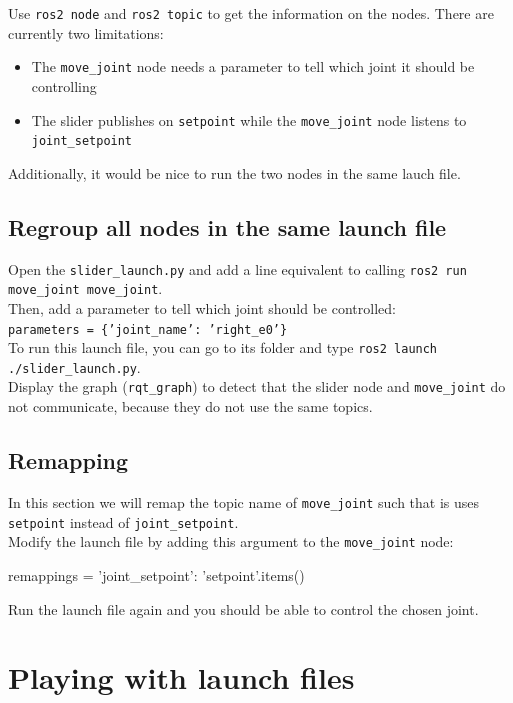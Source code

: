 \documentclass{ecnreport}
\begin{document}
Use \texttt{ros2 node} and \texttt{ros2 topic} to get the information on the nodes. There are currently two limitations:
\begin{itemize}
 \item The \texttt{move\_joint} node needs a parameter to tell which joint it should be controlling
 \item The slider publishes on \texttt{setpoint} while the  \texttt{move\_joint} node listens to \texttt{joint\_setpoint}
\end{itemize}
Additionally, it would be nice to run the two nodes in the same lauch file.

\subsection{Regroup all nodes in the same launch file}

Open the \texttt{slider\_launch.py} and add a line equivalent to calling \texttt{ros2 run move\_joint move\_joint}.\\
Then, add a parameter to tell which joint should be controlled:\\\texttt{parameters = \{'joint\_name': 'right\_e0'\}}\\

To run this launch file, you can go to its folder and type \texttt{ros2 launch ./slider\_launch.py}.\\
Display the graph (\texttt{rqt\_graph}) to detect that the slider node and \texttt{move\_joint} do not communicate, because they do not use the same topics.

\subsection{Remapping}

In this section we will remap the topic name of \texttt{move\_joint} such that is uses \texttt{setpoint} instead of \texttt{joint\_setpoint}.\\

Modify the launch file by adding this argument to the \texttt{move\_joint} node:

\begin{pythoncodelarge}
remappings = {'joint_setpoint': 'setpoint'}.items()
\end{pythoncodelarge}
Run the launch file again and you should be able to control the chosen joint.

\section{Playing with launch files}
\end{document}
